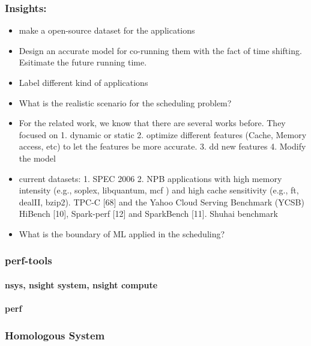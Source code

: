 \documentclass[8pt,UTF8]{article}
\begin{document}
        \subsubsection{Insights:}
            \begin{itemize}
                \item make a open-source dataset for the applications 
                \item Design an accurate model for co-running them with the fact of time shifting. Esitimate the future running time.
                \item Label different kind of applications
                \item What is the realistic scenario for the scheduling problem?
                \item For the related work, we know that there are several works before. They focused on 1. dynamic or static 2. optimize different features (Cache, Memory access, etc) to let the features be more accurate. 3. dd new features 4. Modify the model
                \item current datasets: 1. SPEC 2006 2. NPB applications with high memory intensity (e.g., soplex, libquantum, mcf ) and high cache sensitivity (e.g., ft, dealII, bzip2). TPC-C [68] and the Yahoo Cloud Serving Benchmark (YCSB) HiBench [10], Spark-perf [12] and SparkBench [11]. Shuhai benchmark
                \item What is the boundary of ML applied in the scheduling?
            \end{itemize}
        \subsubsection{perf-tools}
            \paragraph{nsys, nsight system, nsight compute}
            \paragraph{perf}
        \subsubsection{Homologous System}
\end{document}
